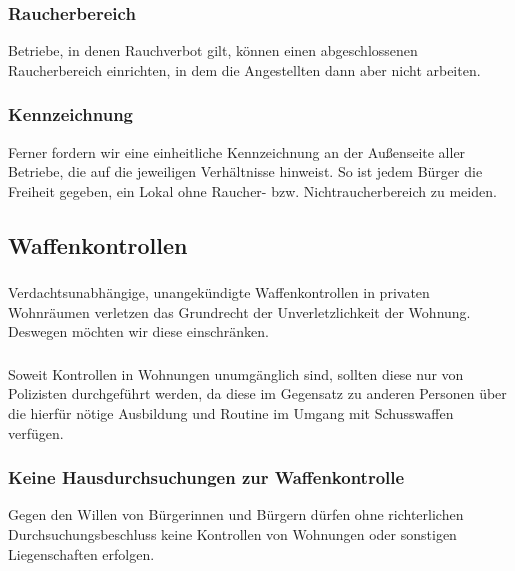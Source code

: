 \subsubsection{Raucherbereich}
\abstimmung
Betriebe, in denen Rauchverbot gilt, können einen abgeschlossenen Raucherbereich einrichten, in dem die Angestellten dann aber nicht arbeiten.

\subsubsection{Kennzeichnung}
\abstimmung
Ferner fordern wir eine einheitliche Kennzeichnung an der Außenseite aller Betriebe, die auf die jeweiligen Verhältnisse hinweist. So ist jedem Bürger die Freiheit gegeben, ein Lokal ohne Raucher- bzw. Nichtraucherbereich zu meiden.
 
\subsection*{Waffenkontrollen}

\subsubsection{ }
\abstimmung
Verdachtsunabhängige, unangekündigte Waffenkontrollen in privaten Wohnräumen verletzen das Grundrecht der Unverletzlichkeit der Wohnung. Deswegen möchten wir diese einschränken.
 

\subsubsection{ }
\abstimmung
Soweit Kontrollen in Wohnungen unumgänglich sind, sollten diese nur von Polizisten durchgeführt werden, da diese im Gegensatz zu anderen Personen über die hierfür nötige Ausbildung und Routine im Umgang mit Schusswaffen verfügen.
 
\newpage
{}

\subsubsection{Keine Hausdurchsuchungen zur Waffenkontrolle}
\abstimmung
Gegen den Willen von Bürgerinnen und Bürgern dürfen ohne richterlichen Durchsuchungsbeschluss keine Kontrollen von Wohnungen oder sonstigen Liegenschaften erfolgen.
 
